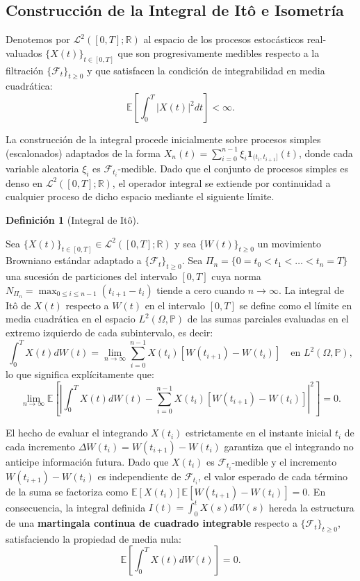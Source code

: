 \documentclass[
  spanish,
  letterpaper,
  DIV=11,
  numbers=noendperiod]{scrreprt}
\theoremstyle{plain}
\theoremstyle{plain}
\theoremstyle{plain}
\theoremstyle{definition}
\newtheorem{definition}{Definición}[chapter]
\theoremstyle{remark}
\begin{document}
\subsection{Construcción de la Integral de Itô e
Isometría}\label{construcciuxf3n-de-la-integral-de-ituxf4-e-isometruxeda}

Denotemos por \(\mathcal{L}^2([0, T]; \mathbb{R})\) al espacio de los
procesos estocásticos real-valuados \(\{X(t)\}_{t \in [0, T]}\) que son
progresivamente medibles respecto a la filtración
\(\{\mathcal{F}_t\}_{t \ge 0}\) y que satisfacen la condición de
integrabilidad en media cuadrática: \[
\mathbb{E}\left[\int_0^T \vert X(t) \vert^2 dt\right] < \infty.
\]

La construcción de la integral procede inicialmente sobre procesos
simples (escalonados) adaptados de la forma
\(\displaystyle X_n(t) = \sum_{i=0}^{n-1} \xi_i \mathbf{1}_{(t_i, t_{i+1}]}(t)\),
donde cada variable aleatoria \(\xi_i\) es
\(\mathcal{F}_{t_i}\)-medible. Dado que el conjunto de procesos simples
es denso en \(\mathcal{L}^2([0, T]; \mathbb{R})\), el operador integral
se extiende por continuidad a cualquier proceso de dicho espacio
mediante el siguiente límite.

\begin{definition}[Integral de
Itô]\protect\hypertarget{def-integral-ito}{}\label{def-integral-ito}

Sea \(\{X(t)\}_{t \in [0, T]} \in \mathcal{L}^2([0, T]; \mathbb{R})\) y
sea \(\{W(t)\}_{t \ge 0}\) un movimiento Browniano estándar adaptado a
\(\{\mathcal{F}_t\}_{t \ge 0}\). Sea
\(\Pi_n = \{0 = t_0 < t_1 < \dots < t_n = T\}\) una sucesión de
particiones del intervalo \([0, T]\) cuya norma
\(\displaystyle N_{\Pi_n} = \max_{0 \le i \le n-1} (t_{i+1} - t_i)\)
tiende a cero cuando \(n \to \infty\). La integral de Itô de \(X(t)\)
respecto a \(W(t)\) en el intervalo \([0, T]\) se define como el límite
en media cuadrática en el espacio \(L^2(\Omega, \mathbb{P})\) de las
sumas parciales evaluadas en el extremo izquierdo de cada subintervalo,
es decir: \[
\int_0^T X(t) dW(t) = \lim_{n \to \infty} \sum_{i=0}^{n-1} X(t_i) \left[ W(t_{i+1}) - W(t_i) \right] \quad \text{en } L^2(\Omega, \mathbb{P}),
\] lo que significa explícitamente que: \[
\lim_{n \to \infty} \mathbb{E}\left[ \left\vert \int_0^T X(t) dW(t) - \sum_{i=0}^{n-1} X(t_i) \left[ W(t_{i+1}) - W(t_i) \right] \right\vert^2 \right] = 0.
\]

\end{definition}

El hecho de evaluar el integrando \(X(t_i)\) estrictamente en el
instante inicial \(t_i\) de cada incremento
\(\Delta W(t_i) = W(t_{i+1}) - W(t_i)\) garantiza que el integrando no
anticipe información futura. Dado que \(X(t_i)\) es
\(\mathcal{F}_{t_i}\)-medible y el incremento \(W(t_{i+1}) - W(t_i)\) es
independiente de \(\mathcal{F}_{t_i}\), el valor esperado de cada
término de la suma se factoriza como
\(\mathbb{E}[X(t_i)]\mathbb{E}[W(t_{i+1}) - W(t_i)] = 0\). En
consecuencia, la integral definida \(I(t) = \int_0^t X(s) dW(s)\) hereda
la estructura de una \textbf{martingala continua de cuadrado integrable}
respecto a \(\{\mathcal{F}_t\}_{t \ge 0}\), satisfaciendo la propiedad
de media nula: \[
\mathbb{E}\left[ \int_0^T X(t) dW(t) \right] = 0.
\]
\end{document}
